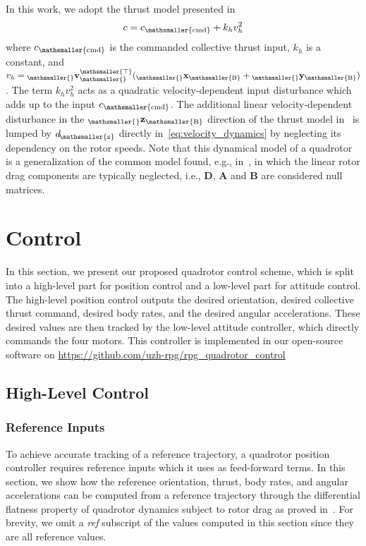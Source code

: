 \documentclass[10pt,a4paper,fleqn]{article}
\newcommand{\bVec}[1]{\mathbf{#1}}
\newcommand{\vect}[3]{{_{\mathsmaller{\mathrm{#2}}}\mathbf{#1}_{\mathsmaller{\mathrm{#3}}}}} %
\newcommand{\vecttrans}[3]{{_{\mathsmaller{\mathrm{#2}}}\mathbf{#1}_{\mathsmaller{\mathrm{#3}}}^{\mathsmaller{\top}}}} %
\newcommand{\bfr}[0]{\ensuremath{B}} %
\newcommand{\thrust}[0]{c} %
\newcommand{\horzthrustcoeff}[0]{k_h} %
\newcommand{\dragcoeff}[1]{\ensuremath{d}_{\!\mathsmaller{\mathrm{#1}}}} %
\newcommand{\dragmat}[0]{\bVec{D}} %
\newcommand{\amat}[0]{\bVec{A}} %
\newcommand{\bmat}[0]{\bVec{B}} %
\begin{document}
In this work, we adopt the thrust model presented in~\cite{Svacha17icuas}
%
\begin{equation}
	\thrust = \thrust_{\mathsmaller{\mathrm{cmd}}} + \horzthrustcoeff v_h^2 \label{eq:thrust_model}
\end{equation}
%
where $\thrust_{\mathsmaller{\mathrm{cmd}}}$ is the commanded collective thrust input, $\horzthrustcoeff$ is a constant, and ${v_h = \vecttrans{v}{}{}( \vect{x}{}{\bfr} + \vect{y}{}{\bfr})}$.
The term $\horzthrustcoeff v_h^2$ acts as a quadratic velocity-dependent input disturbance which adds up to the input $\thrust_{\mathsmaller{\mathrm{cmd}}}$.
The additional linear velocity-dependent disturbance in the $\vect{z}{}{\bfr}$ direction of the thrust model in~\cite{Svacha17icuas} is lumped by $\dragcoeff{z}$ directly in~\eqref{eq:velocity_dynamics} by neglecting its dependency on the rotor speeds.
Note that this dynamical model of a quadrotor is a generalization of the common model found, e.g., in~\cite{Mellinger11icra}, in which the linear rotor drag components are typically neglected, i.e., $\dragmat$, $\amat$ and $\bmat$ are considered null matrices.

\section{Control} \label{sec:control}

In this section, we present our proposed quadrotor control scheme, which is split into a high-level part for position control and a low-level part for attitude control.
The high-level position control outputs the desired orientation, desired collective thrust command, desired body rates, and the desired angular accelerations.
These desired values are then tracked by the low-level attitude controller, which directly commands the four motors.
This controller is implemented in our open-source software on \href{https://github.com/uzh-rpg/rpg_quadrotor_control}{https://github.com/uzh-rpg/rpg\_quadrotor\_control}

\subsection{High-Level Control}

\subsubsection{Reference Inputs}

To achieve accurate tracking of a reference trajectory, a quadrotor position controller requires reference inputs which it uses as feed-forward terms.
In this section, we show how the reference orientation, thrust, body rates, and angular accelerations can be computed from a reference trajectory through the differential flatness property of quadrotor dynamics subject to rotor drag as proved in~\cite{Faessler18ral}.
For brevity, we omit a \emph{ref} subscript of the values computed in this section since they are all reference values.
\end{document}
